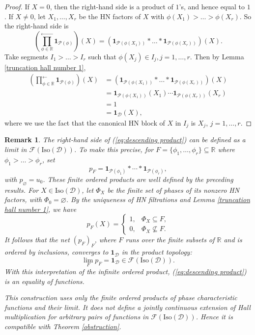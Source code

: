 \documentclass[a4paper,12pt]{amsart}
\numberwithin{equation}{section}
\newtheorem{remark}[theorem]{Remark}
\newcommand{\Iso}{\mathrm{Iso}}
\newcommand{\1}{\mathbf{1}}
\begin{document}
\begin{proof}
    If $X=0$, then the right-hand side is a product of $1$'s, and hence equal to $1$. If $X\neq 0$, let $X_1,\dots, X_r$ be the HN factors of $X$ with $\phi(X_1)>\dots>\phi(X_r)$. So the right-hand side is
    \[\left(\prod_{\phi\in\mathbb{R}}^\leftarrow\1_{\mathcal{P}(\phi)}\right)(X)=(\1_{\mathcal{P}(\phi(X_1))}*\dots*\1_{\mathcal{P}(\phi(X_r))})(X).\]
    Take segments $I_1>\dots>I_r$ such that $\phi(X_j)\in I_j,j=1,\dots,r$. Then by Lemma \ref{truncation hall number 1},
    \begin{align*}
        \left(\prod_{\phi\in\mathbb{R}}^\leftarrow\1_{\mathcal{P}(\phi)}\right)(X)&=(\1_{\mathcal{P}(\phi(X_1))}*\dots*\1_{\mathcal{P}(\phi(X_r))})(X)\\
        &=\1_{\mathcal{P}(\phi(X_1))}(X_1)\cdots\1_{\mathcal{P}(\phi(X_r))}(X_r)\\
        &=1\\
        &=\1_{\mathcal{D}}(X),
    \end{align*}
    where we use the fact that the canonical HN block of $X$ in $I_j$ is $X_j$, $j=1,\dots,r$.
\end{proof}
\begin{remark}
    The right-hand side of (\ref{eq:descending product}) can be defined as a limit in $\mathscr{F}(\Iso(\mathcal{D}))$. To make this precise, for $F=\{\phi_1,\dots,\phi_r\}\subseteq\mathbb{R}$ where $\phi_1>\dots>\phi_r$, set
    \[p_F=\1_{\mathcal{P}(\phi_1)}*\cdots*\1_{\mathcal{P}(\phi_r)},\]
    with $p_{\varnothing}=u_0$. These finite ordered products are well defined by the preceding results. For $X\in\Iso(\mathcal{D})$, let $\Phi_X$ be the finite set of phases of its nonzero HN factors, with $\Phi_0=\varnothing$. By the uniqueness of HN filtrations and Lemma \ref{truncation hall number 1}, we have
    \[p_F(X)=\begin{cases}
            1, & \Phi_X\subseteq F,\\
            0, & \Phi_X\not\subseteq F.
        \end{cases}\]
    It follows that the net $(p_F)_F$, where $F$ runs over the finite subsets of $\mathbb{R}$ and is ordered by inclusions, converges to $\1_{\mathcal{D}}$ in the product topology:
    \[\lim_F p_F=\1_{\mathcal{D}}\in\mathscr{F}(\Iso(\mathcal{D})).\]
    With this interpretation of the infinite ordered product, (\ref{eq:descending product}) is an equality of functions.

    This construction uses only the finite ordered products of phase characteristic functions and their limit. It does not define a jointly continuous extension of Hall multiplication for arbitrary pairs of functions in $\mathscr{F}(\Iso(\mathcal{D}))$. Hence it is compatible with Theorem \ref{obstruction}.
\end{remark}
\end{document}
